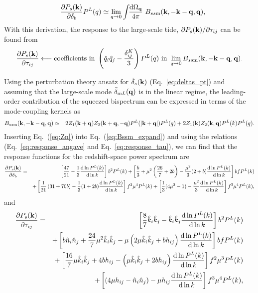 \documentclass[prd,onecolumn,notitlepage,amsmath,amssymb,floatfix,superscriptaddress]{revtex4-1}
\newcommand{\bk}{{\bf k}}
\newcommand{\bq}{{\bf q}}
\newcommand{\hk}{\hat{k}}
\newcommand{\hq}{\hat{q}}
\newcommand{\tdelta}{\tilde{\delta}}
\newcommand{\br}{{\rm b}}
\newcommand{\tdml}{\tilde{\delta}_{{\rm m}L}}
\begin{document}
%
\begin{eqnarray}
&& \frac{\partial P_s(\bk)}{\partial \delta_b}P^L(q)\simeq
\lim_{q\rightarrow 0} \int\!\!\frac{\mathrm{d}\Omega_\bq}{4\pi}~ 
B_{ss{\rm m}}(\bk,-\bk-\bq,\bq),
\label{eq:response_angave}
\end{eqnarray}
% 
With this derivation, the response to the large-scale tide, $\partial P_s(\bk)/\partial \tau_{ij}$ can be found from 
%
\begin{equation}
\frac{\partial P_s(\bk)}{\partial \tau_{ij}} \longleftarrow 
\mbox{coefficients in } \left(\hq_i\hq_j-\frac{\delta^K_{ij}}{3}\right)P^L(q)\mbox{ in }
\lim_{q\rightarrow 0}B_{ss{\rm m}}(\bk,-\bk-\bq,\bq).
\label{eq:response_tau}
\end{equation}
%

Using the perturbation theory ansatz for $\tdelta_s(\bk)$ (Eq.~\ref{eq:deltas_pt}) 
and assuming that the large-scale mode 
$\tdml(\bq)$ is in the linear regime, the leading-order contribution of 
the squeezed bispectrum can be expressed in terms
of the mode-coupling kernels as
%
\begin{eqnarray}
B_{ss{\rm m}}(\bk,-\bk-\bq,\bq)&\simeq& 2Z_1(\bk+\bq)Z_2(\bk+\bq,-\bq)
P^L(|\bk+\bq|)P^L(q)
+2Z_1(\bk)Z_2(\bk,\bq)P^L(k)P^L(q).
\label{eq:Bssm_expand}
\end{eqnarray}
%
Inserting Eq.~(\ref{eq:Zn}) into Eq.~(\ref{eq:Bssm_expand}) and using the relations (Eq.~\ref{eq:response_angave} and Eq.~\ref{eq:response_tau}), 
we can find 
that the response functions for the redshift-space power spectrum are
%
\begin{eqnarray}
\frac{\partial P_s(\bk)}{\partial \delta_\br}&=&
\left[\frac{47}{21}-\frac{1}{3}\frac{\mathrm{d}\ln P^L(k)}{\mathrm{d}\ln k}\right]b^2P^L(k)
+
\left[
\frac{b}{3}+\mu^2\left(\frac{26}{7}+2b\right)
-\frac{\mu^2}{3}(2+b)\frac{\mathrm{d}\ln P^L(k)}{\mathrm{d}\ln k}
\right]bf P^L(k)\nonumber\\
&&+
\left[
\frac{1}{21}\left(31+70b\right)-\frac{1}{3}(1+2b)\frac{\mathrm{d}\ln P^L(k)}{\mathrm{d}\ln k}
\right]f^2\mu^4 P^L(k)
+
\left[\frac{1}{3}(4\mu^2-1)-\frac{\mu^2}{3}\frac{\mathrm{d}\ln P^L(k)}{\mathrm{d}\ln k}\right]
f^3\mu^4P^L(k),
\label{eq:dpsddb}
\end{eqnarray}
%
and
%
\begin{eqnarray}
\frac{\partial P_s(\bk)}{\partial \tau_{ij}}&=&
\left[\frac{8}{7}\hk_i\hk_j -\hk_i\hk_j\frac{\mathrm{d}\ln P^L(k)}{\mathrm{d}\ln k}\right]b^2P^L(k)
\nonumber\\
&&
+\left[b\hat{n}_i\hat{n}_j+\frac{24}{7}\mu^2\hk_i\hk_j
-\mu\left(2\mu \hk_i\hk_j+ bh_{ij}\right)\frac{\mathrm{d}\ln P^L(k)}{\mathrm{d}\ln k}\right]bf P^L(k)
\nonumber\\
&&+
\left[
\frac{16}{7}\mu\hk_i\hk_j+4bh_{ij}
-\left(\mu\hk_i\hk_j+2bh_{ij}\right)\frac{\mathrm{d}\ln P^L(k)}{\mathrm{d}\ln k}
\right]f^2\mu^3P^L(k)
\nonumber\\
&&+
\left[
\left(4\mu h_{ij}-\hat{n}_i\hat{n}_{j}\right)
-\mu h_{ij}\frac{\mathrm{d}\ln P^L(k)}{\mathrm{d}\ln k}
\right]f^3\mu^4P^L(k),
\label{eq:dpsdtau}
\end{eqnarray}
\end{document}
